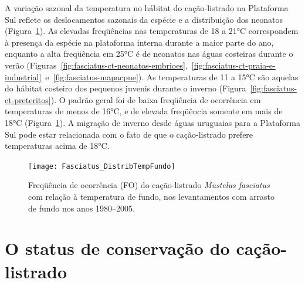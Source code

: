 \documentclass[a4paper,11pt,twoside,showtrims,onecolumn,openright,final]{memoir}
\begin{document}
A variação sazonal da temperatura no hábitat do cação-listrado na Plataforma Sul 
reflete os deslocamentos sazonais da espécie e a distribuição dos neonatos (Figura~\ref{fig:fasciatus-distrib-tempfundo}).
As elevadas freqüências nas temperaturas de 18 a 21°C correspondem à presença da espécie 
na plataforma interna durante a maior parte do ano, enquanto a alta freqüência em 25°C 
é de neonatos nas águas costeiras durante o verão (Figuras~\ref{fig:fasciatus-ct-neonatos-embrioes},~\ref{fig:fasciatus-ct-praia-e-industrial}~e~\ref{fig:fasciatus-mapacpue}).  
As temperaturas de 11 a 15°C são aquelas do hábitat costeiro dos pequenos juvenis durante 
o inverno (Figura~\ref{fig:fasciatus-ct-preteritos}). 
O padrão geral foi de baixa freqüência de ocorrência em temperaturas de menos de 16°C, 
e de elevada freqüência somente em mais de 18°C (Figura~\ref{fig:fasciatus-distrib-tempfundo}). 
A migração de inverno desde águas uruguaias para a Plataforma Sul pode estar relacionada 
com o fato de que o cação-listrado prefere temperaturas acima de 18°C.  

%
%

\begin{figure}
\begin{center}
\texttt{[image: Fasciatus\_DistribTempFundo]}
\end{center}
\caption[Freqüência de ocorrência (FO) do cação-listrado \emph{Mustelus fasciatus} 
	 com relação à temperatura de fundo]
	{Freqüência de ocorrência (FO) do cação-listrado \emph{Mustelus fasciatus} 
	 com relação à temperatura de fundo, nos levantamentos com 
	 arrasto de fundo nos anos 1980--2005.}
\label{fig:fasciatus-distrib-tempfundo}
\end{figure}


\section*{O status de conservação do cação-listrado}
\end{document}
